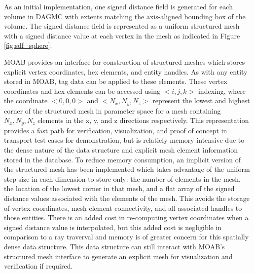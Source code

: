 As an initial implementation, one signed distance field is generated for each
volume in DAGMC with extents matching the axis-aligned bounding box of the
volume. The signed distance field is represented as a uniform structured mesh
with a signed distance value at each vertex in the mesh as indicated in Figure
\ref{fig:sdf_sphere}.

MOAB provides an interface for construction of structured meshes which stores
explicit vertex coordinates, hex elements, and entity handles. As with any
entity stored in MOAB, tag data can be applied to these elements. These vertex
coordinates and hex elements can be accessed using $<i,j,k>$ indexing, where the
coordinate $<0,0,0>$ and $<N_{x}, N_{y}, N_{z}>$ represent the lowest and
highest corner of the structured mesh in parameter space for a mesh containing
$N_{x},N_{y},N_{z}$ elements in the x, y, and z directions respectively. This
representation provides a fast path for verification, visualization, and proof
of concept in transport test cases for demonstration, but is relatiely memory
intensive due to the dense nature of the data structure and explicit mesh
element information stored in the database. To reduce  memory consumption,
an implicit version of the structured mesh has been implemented which takes
advantage of the uniform step size in each dimension to store only: the number
of elements in the mesh, the location of the lowest corner in that mesh, and a
flat array of the signed distance values associated with the elements of the
mesh.
This avoids the storage of vertex coordinates, mesh element connectivity, and
all associated handles to those entities. There is an added cost in re-computing
vertex coordinates when a signed distance value is interpolated, but this added
cost is negligible in comparison to a ray traverval and memory is of greater
concern for this spatially dense data structure. This data structure can still
interact with MOAB's structured mesh interface to generate an explicit mesh for
visualization and verification if required.


